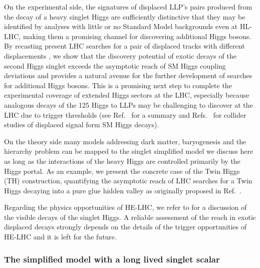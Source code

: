 On the experimental side, the signatures of displaced LLP's pairs produced from the decay of a heavy singlet Higgs are sufficiently distinctive that they may be identified by analyses with little or no Standard Model backgrounds even at HL-LHC, making them a promising channel for discovering additional Higgs bosons. By recasting present LHC searches for a pair of displaced tracks with different displacements \cite{Aad:2015uaa,CMS:2014wda,Aaboud:2018aqj,Sirunyan:2018pwn}, we show that the discovery potential of exotic decays of the second Higgs singlet exceeds the asymptotic reach of SM Higgs coupling deviations and provides a natural avenue for the further development of searches for additional Higgs bosons. This is a promising next step to complete the experimental coverage of extended Higgs sectors at the LHC, especially because analogous decays of the 125 \UGeV Higgs to LLPs may be challenging to discover at the LHC due to trigger thresholds (see Ref.~\cite{Curtin:2013fra} for a summary and Refs.~\cite{Clarke:2015ala,Csaki:2015fba,Curtin:2015fna,Pierce:2017taw} for collider studies of displaced signal form SM Higgs decays).
  
On the theory side many models addressing dark matter, baryogenesis and the hierarchy problem can be mapped to the singlet simplified model we discuss here as long as the interactions of the heavy Higgs are controlled primarily by the Higgs portal. As an example, we present the concrete case of the Twin Higgs (TH) construction, quantifying the asymptotic reach of LHC searches for a Twin Higgs decaying into a pure glue hidden valley as originally proposed in Ref.~\cite{Craig:2015pha}. 

Regarding the physics opportunities of HE-LHC, we refer to \cite{CidVidal:2018eel} for a discussion of the visible decays of the singlet Higgs. A reliable assessment of the reach in exotic displaced decays strongly depends on the details of the trigger opportunities of HE-LHC and it is left for the future.    

\subsubsection{The simplified model with a long lived singlet scalar}

